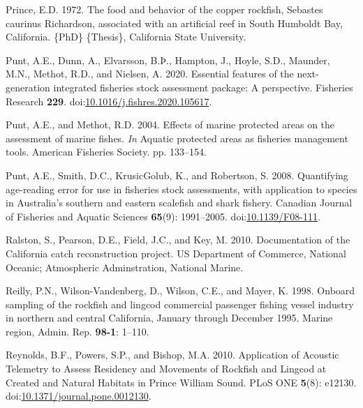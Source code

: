 \documentclass[11pt,
  english,
  letterpaper,
]{article}
\newlength{\cslhangindent}
\newenvironment{CSLReferences}[2] %
 {%
  \setlength{\parindent}{0pt}
  \ifodd #1 \everypar{\setlength{\hangindent}{\cslhangindent}}\ignorespaces\fi
  \ifnum #2 > 0
  \setlength{\parskip}{#2\baselineskip}
  \fi
 }%
 {}
\begin{document}
\begin{CSLReferences}{1}{0}
\leavevmode{}%
Prince, E.D. 1972. The food and behavior of the copper rockfish, {Sebastes} caurinus {Richardson}, associated with an artificial reef in {South} {Humboldt} {Bay}, {California}. \{PhD\} \{Thesis\}, California State University.

\leavevmode{}%
Punt, A.E., Dunn, A., Elvarsson, B.Þ., Hampton, J., Hoyle, S.D., Maunder, M.N., Methot, R.D., and Nielsen, A. 2020. Essential features of the next-generation integrated fisheries stock assessment package: {A} perspective. Fisheries Research \textbf{229}. doi:\href{https://doi.org/10.1016/j.fishres.2020.105617}{10.1016/j.fishres.2020.105617}.

\leavevmode{}%
Punt, A.E., and Methot, R.D. 2004. Effects of marine protected areas on the assessment of marine fishes. \emph{In} Aquatic protected areas as fisheries management tools. {American} {Fisheries} {Society}. pp. 133--154.

\leavevmode{}%
Punt, A.E., Smith, D.C., KrusicGolub, K., and Robertson, S. 2008. Quantifying age-reading error for use in fisheries stock assessments, with application to species in {Australia}'s southern and eastern scalefish and shark fishery. Canadian Journal of Fisheries and Aquatic Sciences \textbf{65}(9): 1991--2005. doi:\href{https://doi.org/10.1139/F08-111}{10.1139/F08-111}.

\leavevmode{}%
Ralston, S., Pearson, D.E., Field, J.C., and Key, M. 2010. Documentation of the {California} catch reconstruction project. US Department of Commerce, National Oceanic; Atmospheric Adminstration, National Marine.

\leavevmode{}%
Reilly, P.N., Wilson-Vandenberg, D., Wilson, C.E., and Mayer, K. 1998. Onboard sampling of the rockfish and lingcod commercial passenger fishing vessel industry in northern and central {California}, {January} through {December} 1995. Marine region, Admin. Rep. \textbf{98-1}: 1--110.

\leavevmode{}%
Reynolds, B.F., Powers, S.P., and Bishop, M.A. 2010. Application of {Acoustic} {Telemetry} to {Assess} {Residency} and {Movements} of {Rockfish} and {Lingcod} at {Created} and {Natural} {Habitats} in {Prince} {William} {Sound}. PLoS ONE \textbf{5}(8): e12130. doi:\href{https://doi.org/10.1371/journal.pone.0012130}{10.1371/journal.pone.0012130}.


\end{CSLReferences}
\end{document}
